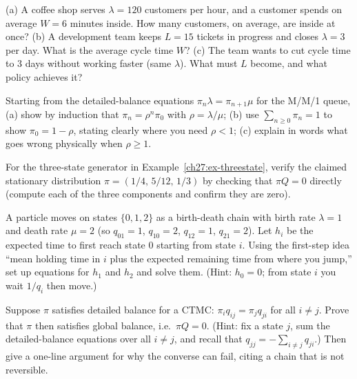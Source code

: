 \begin{exercise}
\label{ch27:exr-little}
(a) A coffee shop serves $\lambda = 120$ customers per hour, and a customer spends on average
$W = 6$ minutes inside. How many customers, on average, are inside at once? (b) A development team
keeps $L = 15$ tickets in progress and closes $\lambda = 3$ per day. What is the average cycle time
$W$? (c) The team wants to cut cycle time to $3$ days without working faster (same $\lambda$). What
must $L$ become, and what policy achieves it?
\end{exercise}

\begin{exercise}
\label{ch27:exr-derive-geom}
Starting from the detailed-balance equations $\pi_n \lambda = \pi_{n+1}\mu$ for the M/M/1 queue,
(a) show by induction that $\pi_n = \rho^n \pi_0$ with $\rho = \lambda/\mu$; (b) use
$\sum_{n\ge0}\pi_n = 1$ to show $\pi_0 = 1 - \rho$, stating clearly where you need $\rho < 1$;
(c) explain in words what goes wrong physically when $\rho \ge 1$.
\end{exercise}

\begin{exercise}
\label{ch27:exr-global}
For the three-state generator in Example~\ref{ch27:ex-threestate}, verify the claimed stationary
distribution $\pi = (1/4,\,5/12,\,1/3)$ by checking that $\pi Q = 0$ directly (compute each of the
three components and confirm they are zero).
\end{exercise}

\begin{exercise}
\label{ch27:exr-hitting}
A particle moves on states $\{0,1,2\}$ as a birth-death chain with birth rate $\lambda = 1$ and death
rate $\mu = 2$ (so $q_{01}=1$, $q_{10}=2$, $q_{12}=1$, $q_{21}=2$). Let $h_i$ be the expected time to
first reach state $0$ starting from state $i$. Using the first-step idea ``mean holding time in $i$
plus the expected remaining time from where you jump,'' set up equations for $h_1$ and $h_2$ and
solve them. (Hint: $h_0 = 0$; from state $i$ you wait $1/q_i$ then move.)
\end{exercise}

\begin{exercise}
\label{ch27:exr-proof-balance}
Suppose $\pi$ satisfies detailed balance for a CTMC: $\pi_i q_{ij} = \pi_j q_{ji}$ for all
$i \ne j$. Prove that $\pi$ then satisfies global balance, i.e.\ $\pi Q = 0$. (Hint: fix a state $j$,
sum the detailed-balance equations over all $i \ne j$, and recall that $q_{jj} = -\sum_{i\ne j}
q_{ji}$.) Then give a one-line argument for why the converse can fail, citing a chain that is not
reversible.
\end{exercise}

